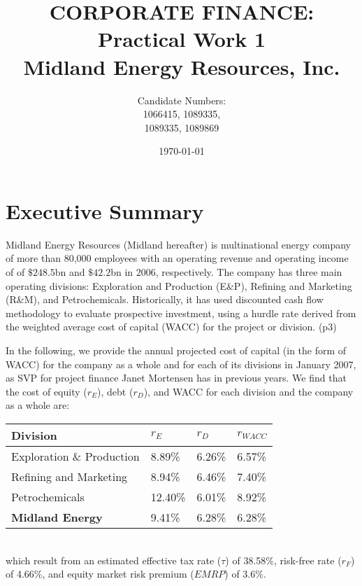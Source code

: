 \documentclass{article}
\title{CORPORATE FINANCE: \\Practical Work 1\\ Midland Energy Resources, Inc.}
\author{Candidate Numbers: \\1066415, 1089335, \\1089335, 1089869}
\date{\today}
\begin{document}
\maketitle

\newpage
\hrulefill
\section{Executive Summary}
Midland Energy Resources (Midland hereafter) is  multinational energy company of more than 80,000 employees with an operating revenue and operating income of of $\$248.5$bn and $\$42.2$bn in 2006, respectively. The company has three main operating divisions: Exploration and Production (E\&P), Refining and Marketing (R\&M), and Petrochemicals. Historically, it has used discounted cash flow methodology to evaluate prospective investment, using a hurdle rate derived from the weighted average cost of capital (WACC) for the project or division. (p3)

In the following, we provide the annual projected cost of capital (in the form of WACC) for the company as a whole and for each of its divisions in January 2007, as SVP for project finance Janet Mortensen has in previous years.
We find that the cost of equity ($r_E$), debt ($r_D$), and WACC for each division and the company as a whole are:
\begin{table}[h]
    \centering
    \begin{tabular}{llll}
    \textbf{Division}                  & $r_E$    & $r_D$   & $r_{W\!ACC}$ \\ \hline
    Exploration \& Production & 8.89\%  & 6.26\% & 6.57\%  \\
    Refining and Marketing    & 8.94\%  & 6.46\% & 7.40\%  \\
    Petrochemicals            & 12.40\% & 6.01\% & 8.92\%  \\ \hline
    \textbf{Midland Energy}   & 9.41\%  & 6.28\% & 6.28\% 
    \end{tabular}
\end{table}\\
which result from an estimated effective tax rate ($\tau$) of 38.58\%, risk-free rate ($r_F$) of 4.66\%, and equity market risk premium ($EMRP$) of 3.6\%.

\hrulefill
\end{document}
